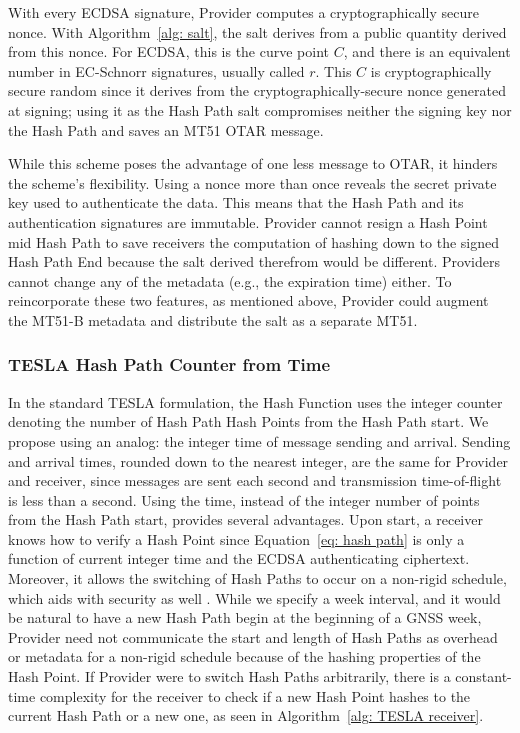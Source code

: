 \documentclass[letterpaper,times]{IONconf/IONconf}
\begin{document}
			With every ECDSA signature, Provider computes a cryptographically secure nonce.
			With Algorithm~\ref{alg: salt}, the salt derives from a public quantity derived from this nonce.
			For ECDSA, this is the curve point $C$, and there is an equivalent number in EC-Schnorr signatures, usually called $r$.
			This $C$ is cryptographically secure random since it derives from the cryptographically-secure nonce generated at signing; using it as the Hash Path salt compromises neither the signing key nor the Hash Path and saves an MT51 OTAR message.

			While this scheme poses the advantage of one less message to OTAR, it hinders the scheme's flexibility.
			Using a nonce more than once reveals the secret private key used to authenticate the data.
			This means that the Hash Path and its authentication signatures are immutable.
			Provider cannot resign a Hash Point mid Hash Path to save receivers the computation of hashing down to the signed Hash Path End because the salt derived therefrom would be different.
			Providers cannot change any of the metadata (e.g., the expiration time) either.
			To reincorporate these two features, as mentioned above, Provider could augment the MT51-B metadata and distribute the salt as a separate MT51.

		\subsubsection{TESLA Hash Path Counter from Time} \label{subsub:time_counter}

			In the standard TESLA formulation, the Hash Function uses the integer counter denoting the number of Hash Path Hash Points from the Hash Path start.
			We propose using an analog: the integer time of message sending and arrival.
			Sending and arrival times, rounded down to the nearest integer, are the same for Provider and receiver, since messages are sent each second and transmission time-of-flight is less than a second.
			Using the time, instead of the integer number of points from the Hash Path start, provides several advantages.
			Upon start, a receiver knows how to verify a Hash Point since Equation~\eqref{eq: hash path} is only a function of current integer time and the ECDSA authenticating ciphertext.
			Moreover, it allows the switching of Hash Paths to occur on a non-rigid schedule, which aids with security as well \cite{chain-security}.
			While we specify a week interval, and it would be natural to have a new Hash Path begin at the beginning of a GNSS week, Provider need not communicate the start and length of Hash Paths as overhead or metadata for a non-rigid schedule because of the hashing properties of the Hash Point.
			If Provider were to switch Hash Paths arbitrarily, there is a constant-time complexity for the receiver to check if a new Hash Point hashes to the current Hash Path or a new one, as seen in Algorithm~\ref{alg: TESLA receiver}.
\end{document}
